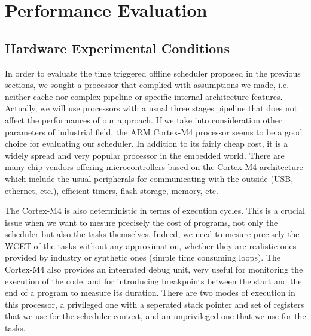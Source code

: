 \documentclass[conference,compsocconf]{IEEEtran}
\begin{document}
\section{Performance Evaluation}

\subsection{Hardware Experimental Conditions}

In order to evaluate the time triggered offline scheduler proposed in the
previous sections, we sought a processor that complied with assumptions we
made, i.e. neither cache nor complex pipeline or specific internal architecture
features. Actually, we will use processors with a usual three stages pipeline
that does not affect the performances of our approach.
If we take into consideration other parameters of industrial field, the ARM
Cortex-M4 processor seems to be a good choice for evaluating our scheduler.
In addition to its fairly cheap cost, it is a widely spread and very popular
processor in the embedded world. There are many chip vendors offering
microcontrollers based on the Cortex-M4 architecture which include the usual
peripherals for communicating with the outside (USB, ethernet, etc.), efficient
timers, flash storage, memory, etc.

The Cortex-M4 is also deterministic in terms of execution cycles. This is a
crucial issue when we want to mesure precisely the cost of programs, not only
the scheduler but also the tasks themselves. Indeed, we need to mesure
precisely the WCET of the tasks without any approximation, whether they are
realistic ones provided by industry or synthetic ones (simple time consuming
loops). The Cortex-M4 also provides an integrated debug unit, very useful for
monitoring the execution of the code, and for introducing breakpoints between
the start and the end of a program to measure its duration. There are two modes
of execution in this processor, a privileged one with a seperated stack pointer
and set of registers that we use for the scheduler context, and an unprivileged
one that we use for the tasks.
\end{document}
